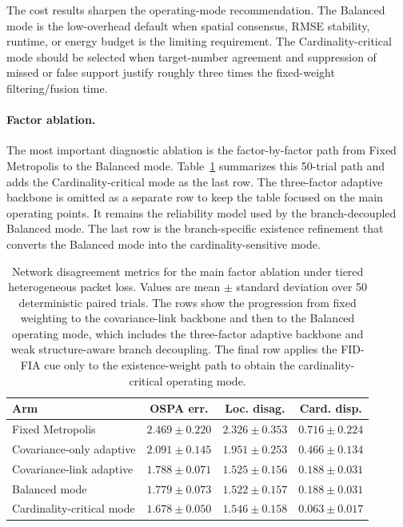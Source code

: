 The cost results sharpen the operating-mode recommendation. The Balanced mode is the low-overhead default when spatial consensus, RMSE stability, runtime, or energy budget is the limiting requirement. The Cardinality-critical mode should be selected when target-number agreement and suppression of missed or false support justify roughly three times the fixed-weight filtering/fusion time.

\paragraph{Factor ablation.}

The most important diagnostic ablation is the factor-by-factor path from Fixed Metropolis to the Balanced mode. Table~\ref{tab:ablation} summarizes this 50-trial path and adds the Cardinality-critical mode as the last row. The three-factor adaptive backbone is omitted as a separate row to keep the table focused on the main operating points. It remains the reliability model used by the branch-decoupled Balanced mode. The last row is the branch-specific existence refinement that converts the Balanced mode into the cardinality-sensitive mode.

\begin{table}[t]
  \centering
  \caption{Network disagreement metrics for the main factor ablation under tiered heterogeneous packet loss. Values are mean $\pm$ standard deviation over 50 deterministic paired trials. The rows show the progression from fixed weighting to the covariance-link backbone and then to the Balanced operating mode, which includes the three-factor adaptive backbone and weak structure-aware branch decoupling. The final row applies the FID-FIA cue only to the existence-weight path to obtain the cardinality-critical operating mode.}
  \label{tab:ablation}
  \begin{tabular}{lccc}
    \toprule
    Arm & OSPA err. & Loc. disag. & Card. disp. \\
    \midrule
    Fixed Metropolis & $2.469 \pm 0.220$ & $2.326 \pm 0.353$ & $0.716 \pm 0.224$ \\
    Covariance-only adaptive & $2.091 \pm 0.145$ & $1.951 \pm 0.253$ & $0.466 \pm 0.134$ \\
    Covariance-link adaptive & $1.788 \pm 0.071$ & $1.525 \pm 0.156$ & $0.188 \pm 0.031$ \\
    Balanced mode & $1.779 \pm 0.073$ & $\mathbf{1.522} \pm 0.157$ & $0.188 \pm 0.031$ \\
    Cardinality-critical mode & $\mathbf{1.678} \pm 0.050$ & $1.546 \pm 0.158$ & $\mathbf{0.063} \pm 0.017$ \\
    \bottomrule
  \end{tabular}
\end{table}

